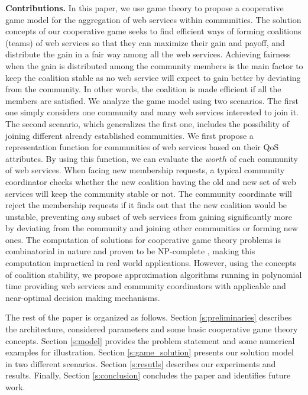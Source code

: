 \documentclass[10pt,journal,cspaper,compsoc]{IEEEtran}
\begin{document}
\textbf{Contributions.} In this paper, we use game theory to
propose a cooperative game model for the aggregation of web
services within communities. The solution concepts of our
cooperative game seeks to find efficient ways of forming
coalitions (teams) of web services so that they can maximize their
gain and payoff, and distribute the gain in a fair way among all
the web services. Achieving fairness when the gain is distributed
among the community members is the main factor to keep the
coalition stable as no web service will expect to gain better by
deviating from the community. In other words, the coalition is
made efficient if all the members are satisfied. We analyze the
game model using two scenarios. The first one simply considers one
community and many web services interested to join it. The second
scenario, which generalizes the first one, includes the
possibility of joining different already established communities.
We first propose a representation function for communities of web
services based on their QoS attributes. By using this function, we
can evaluate the $worth$ of each community of web services. When
facing new membership requests, a typical community coordinator checks
whether the new coalition having the old and new set of web
services will keep the community stable or not. The community
coordinate will reject the membership requests if it finds out that
the new coalition would be unstable, preventing $any$ subset of
web services from gaining significantly more by deviating from the
community and joining other communities or forming new ones. The
computation of solutions for cooperative game theory problems is
combinatorial in nature and proven to be NP-complete
\cite{Algorithmic}, making this computation impractical in real
world applications. However, using the concepts of coalition
stability, we propose approximation algorithms running in
polynomial time providing web services and community coordinators with
applicable and near-optimal decision making mechanisms.

The rest of the paper is organized as follows. Section
\ref{s:preliminaries} describes the architecture, considered
parameters and some basic cooperative game theory concepts.
Section \ref{s:model} provides the problem statement and some
numerical examples for illustration. Section \ref{s:game_solution}
presents our solution model in two different scenarios. Section
\ref{s:resutls} describes our experiments and results. Finally,
Section \ref{s:conclusion} concludes the paper and identifies
future work.
\end{document}
